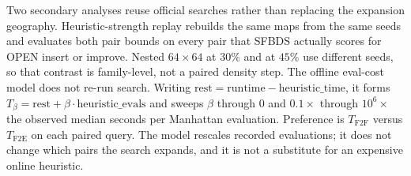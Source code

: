 Two secondary analyses reuse official searches rather than replacing the expansion geography. Heuristic-strength replay rebuilds the same maps from the same seeds and evaluates both pair bounds on every pair that SFBDS actually scores for OPEN insert or improve. Nested \(64\times 64\) at \(30\%\) and at \(45\%\) use different seeds, so that contrast is family-level, not a paired density step. The offline eval-cost model does not re-run search. Writing \(\mathrm{rest}=\mathrm{runtime}-\mathrm{heuristic\_time}\), it forms \(T_\beta=\mathrm{rest}+\beta\cdot\mathrm{heuristic\_evals}\) and sweeps \(\beta\) through \(0\) and \(0.1\times\) through \(10^6\times\) the observed median seconds per Manhattan evaluation. Preference is \(T_{\mathrm{F2F}}\) versus \(T_{\mathrm{F2E}}\) on each paired query. The model rescales recorded evaluations; it does not change which pairs the search expands, and it is not a substitute for an expensive online heuristic.
